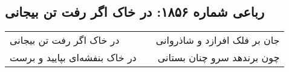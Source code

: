 \begin{center}
\section*{رباعی شماره ۱۸۵۶: در خاک اگر رفت تن بیجانی}
\label{sec:1856}
\begin{longtable}{l p{0.5cm} r}
در خاک اگر رفت تن بیجانی
&&
جان بر فلک افرازد و شاذروانی
\\
در خاک بنفشه‌ای بپایید و برست
&&
چون برندهد سرو چنان بستانی
\\
\end{longtable}
\end{center}
